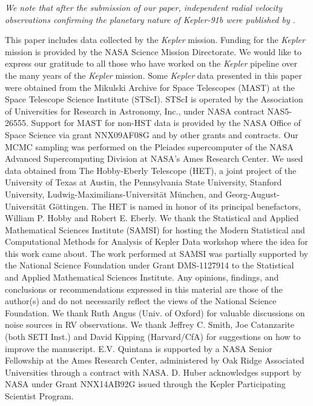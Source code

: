 \documentclass[apjl]{emulateapj}
\begin{document}


\emph{We note that after the submission of our paper, independent radial velocity observations confirming the planetary nature of Kepler-91b were published by \citet{lillo14b}.}

\acknowledgments
This paper includes data collected by the \emph{Kepler} mission. Funding for the \emph{Kepler} mission is provided by the NASA Science Mission Directorate. We would like to express our gratitude to all those who have worked on the \emph{Kepler} pipeline over the many years of the \emph{Kepler} mission. Some \emph{Kepler} data presented in this paper were obtained from the Mikulski Archive for Space Telescopes (MAST) at the Space Telescope Science Institute (STScI). STScI is operated by the Association of Universities for Research in Astronomy, Inc., under NASA contract NAS5-26555. Support for MAST for non-HST data is provided by the NASA Office of Space Science via grant NNX09AF08G and by other grants and contracts. Our MCMC sampling was performed on the Pleiades supercomputer of the NASA Advanced Supercomputing Division at NASA's Ames Research Center. We used data obtained from The Hobby-Eberly Telescope (HET), a joint project of the University of Texas at Austin, the Pennsylvania State University, Stanford University, Ludwig-Maximilians-Universit\"{a}t M\"{u}nchen, and Georg-August-Universit\"{a}t G\"{o}ttingen. The HET is named in honor of its principal benefactors, William P. Hobby and Robert E. Eberly. We thank the Statistical and Applied Mathematical Sciences Institute (SAMSI) for hosting the Modern Statistical and Computational Methods for Analysis of Kepler Data workshop where the idea for this work came about. The work performed at SAMSI was partially supported by the National Science Foundation under Grant DMS-1127914 to the Statistical and Applied Mathematical Sciences Institute. Any opinions, findings, and conclusions or recommendations expressed in this material are those of the author(s) and do not necessarily reflect the views of the National Science Foundation. We thank Ruth Angus (Univ. of Oxford) for valuable discussions on noise sources in RV observations. We thank Jeffrey C. Smith, Joe Catanzarite (both SETI Inst.) and David Kipping (Harvard/CfA) for suggestions on how to improve the manuscript. E.V. Quintana is supported by a NASA Senior Fellowship at the Ames Research Center, administered by Oak Ridge Associated Universities through a contract with NASA. D. Huber acknowledges support by NASA under Grant NNX14AB92G issued through the Kepler Participating Scientist Program.
\end{document}
